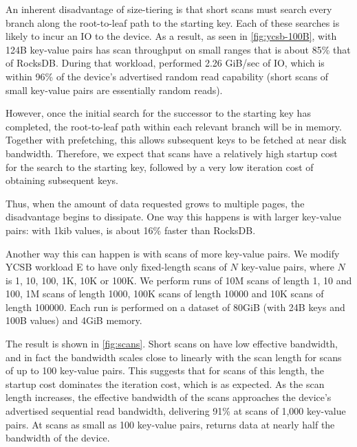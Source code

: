 An inherent disadvantage of size-tiering is that short scans must search every
branch along the root-to-leaf path to the starting key. Each of these searches
is likely to incur an IO to the device. As a result, as seen in
\cref{fig:ycsb-100B}, \sysname{} with 124B key-value pairs has scan throughput
on small ranges that is about 85\% that of RocksDB. During that workload,
\sysname performed 2.26 GiB/sec of IO, which is within 96\% of the device's
advertised random read capability (short scans of small key-value pairs are
essentially random reads).

However, once the initial search for the successor to the starting key has
completed, the root-to-leaf path within each relevant branch will be in memory.
Together with prefetching, this allows subsequent keys to be fetched at near
disk bandwidth. Therefore, we expect that scans have a relatively high startup
cost for the search to the starting key, followed by a very low iteration cost
of obtaining subsequent keys.

Thus, when the amount of data requested grows to multiple pages, the
disadvantage begins to dissipate. One way this happens is with larger key-value
pairs: with 1kib values, \sysname is about 16\% faster than RocksDB.

Another way this can happen is with scans of more key-value pairs.  We modify
YCSB workload E to have only fixed-length scans of $N$ key-value pairs, where
$N$ is 1, 10, 100, 1K, 10K or 100K.  We perform runs of 10M scans of length 1,
10 and 100, 1M scans of length 1000, 100K scans of length 10000 and 10K scans
of length 100000. Each run is performed on a dataset of 80GiB (with 24B keys and
100B values) and 4GiB memory.

The result is shown in \cref{fig:scans}. Short scans on \sysname have low
effective bandwidth, and in fact the bandwidth scales close to linearly with
the scan length for scans of up to 100 key-value pairs. This suggests that for
scans of this length, the startup cost dominates the iteration cost, which is
as expected.  As the scan length increases, the effective bandwidth of the
scans approaches the device's advertised sequential read bandwidth, delivering
91\% at scans of 1,000 key-value pairs.  At scans as small as 100 key-value
pairs, \sysname{} returns data at nearly half the bandwidth of the device.


